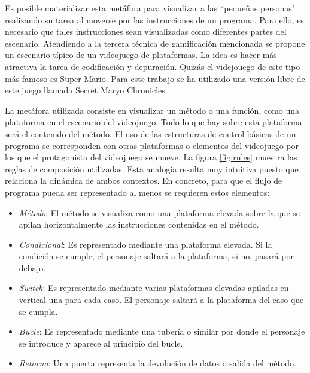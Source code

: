 \documentclass{llncs}
\begin{document}
Es posible materializar esta metáfora para visualizar a las ``pequeñas personas" realizando su tarea al moverse por las instrucciones de un programa. Para ello, es necesario que tales instrucciones sean visualizadas como diferentes partes del escenario. Atendiendo a la tercera técnica de gamificación mencionada se propone un escenario típico de un videojuego de plataformas. La idea es hacer más atractiva la tarea de codificación y depuración. Quizás el videjouego de este tipo más famoso es Super Mario. Para este trabajo se ha utilizado una versión libre de este juego llamada Secret Maryo Chronicles.

La metáfora utilizada consiste en visualizar un método o una función, como una plataforma en el escenario del videojuego. Todo lo que hay sobre esta plataforma será el contenido del método. El uso de las estructuras de control básicas de un programa se corresponden con otras plataformas o elementos del videojuego por los que el protagonista del videojuego se mueve.  La figura \ref{fig:rules} muestra las reglas de composición utilizadas. Esta analogía resulta muy intuitiva puesto que relaciona la dinámica de ambos contextos. En concreto, para que el flujo de programa pueda ser representado al menos se requieren estos elementos: 

\begin{itemize}
\item {\em Método}: El método se visualiza como una plataforma elevada sobre la que se apilan horizontalmente las instrucciones contenidas en el método.
\item {\em Condicional}: Es representado mediante una plataforma elevada. Si la condición se cumple, el personaje saltará a la plataforma, si no, pasará por debajo.
\item {\em Switch}: Es representado mediante varias plataformas elevadas apiladas en vertical una para cada caso. El personaje saltará a la plataforma del caso que se cumpla.
\item {\em Bucle}: Es representado mediante una tubería o similar por donde el personaje se introduce y aparece al principio del bucle.
\item {\em Retorno}: Una puerta representa la devolución de datos o salida del método.
\end{itemize}
\end{document}
